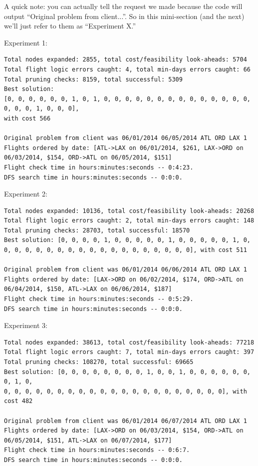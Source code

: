 \documentclass{article}
\begin{document}
A quick note: you can actually tell the request we made because the code will output ``Original problem from client...''. So in this mini-section (and
the next) we'll just refer to them as ``Experiment X.''

Experiment 1:

\scriptsize
\begin{verbatim}
Total nodes expanded: 2855, total cost/feasibility look-aheads: 5704
Total flight logic errors caught: 4, total min-days errors caught: 66
Total pruning checks: 8159, total successful: 5309
Best solution:
[0, 0, 0, 0, 0, 0, 1, 0, 1, 0, 0, 0, 0, 0, 0, 0, 0, 0, 0, 0, 0, 0, 0, 0, 0, 0, 1, 0, 0, 0],
with cost 566

Original problem from client was 06/01/2014 06/05/2014 ATL ORD LAX 1
Flights ordered by date: [ATL->LAX on 06/01/2014, $261, LAX->ORD on 06/03/2014, $154, ORD->ATL on 06/05/2014, $151]
Flight check time in hours:minutes:seconds -- 0:4:23.
DFS search time in hours:minutes:seconds -- 0:0:0.
\end{verbatim}
\normalsize

Experiment 2:

\scriptsize
\begin{verbatim}
Total nodes expanded: 10136, total cost/feasibility look-aheads: 20268
Total flight logic errors caught: 2, total min-days errors caught: 148
Total pruning checks: 28703, total successful: 18570
Best solution: [0, 0, 0, 0, 1, 0, 0, 0, 0, 0, 1, 0, 0, 0, 0, 0, 1, 0,
0, 0, 0, 0, 0, 0, 0, 0, 0, 0, 0, 0, 0, 0, 0, 0, 0, 0], with cost 511

Original problem from client was 06/01/2014 06/06/2014 ATL ORD LAX 1
Flights ordered by date: [LAX->ORD on 06/02/2014, $174, ORD->ATL on 06/04/2014, $150, ATL->LAX on 06/06/2014, $187]
Flight check time in hours:minutes:seconds -- 0:5:29.
DFS search time in hours:minutes:seconds -- 0:0:0.
\end{verbatim}
\normalsize

Experiment 3:

\scriptsize
\begin{verbatim}
Total nodes expanded: 38613, total cost/feasibility look-aheads: 77218
Total flight logic errors caught: 7, total min-days errors caught: 397
Total pruning checks: 108270, total successful: 69665
Best solution: [0, 0, 0, 0, 0, 0, 0, 0, 1, 0, 0, 1, 0, 0, 0, 0, 0, 0, 0, 1, 0,
0, 0, 0, 0, 0, 0, 0, 0, 0, 0, 0, 0, 0, 0, 0, 0, 0, 0, 0, 0, 0], with cost 482

Original problem from client was 06/01/2014 06/07/2014 ATL ORD LAX 1
Flights ordered by date: [LAX->ORD on 06/03/2014, $154, ORD->ATL on 06/05/2014, $151, ATL->LAX on 06/07/2014, $177]
Flight check time in hours:minutes:seconds -- 0:6:7.
DFS search time in hours:minutes:seconds -- 0:0:0.
\end{verbatim}
\normalsize
\end{document}
